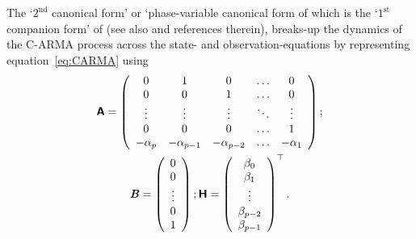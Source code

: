 \documentclass[a4paper,fleqn,usenatbib]{mnras}
\begin{document}
The `$2^{\mathrm{nd}}$ canonical form' or `phase-variable canonical form of \citet{Wiberg} which is the `$1^{\mathrm{st}}$ companion form' of \citet{Friedland} (see also \citealp{Kelly14} and references therein), breaks-up the dynamics of the C-ARMA process across the state- and observation-equations by representing equation~\eqref{eq:CARMA} using
\begin{multline}\label{eq:2ndCanForm}
\textbf{\textsf{A}} = \left( \begin{array}{ccccc}
0 & 1 & 0 & \hdots & 0 \\
0 & 0 & 1 & \hdots & 0 \\
\vdots & \vdots & \vdots & \ddots & \vdots \\
0 & 0 & 0 & \hdots & 1 \\
-\alpha_{p} & -\alpha_{p-1} & -\alpha_{p-2} & \hdots & -\alpha_{1} \\
\end{array}\right); \\ \textbf{\textit{B}} = \left( \begin{array}{c} 0 \\ 0 \\ \vdots \\ 0 \\ 1 \end{array} \right); \textbf{\textsf{H}} = \left( \begin{array}{c} \beta_{0} \\ \beta_{1} \\ \vdots \\ \beta_{p-2} \\ \beta_{p-1} \end{array} \right)^{\top}.
\end{multline}
\end{document}
